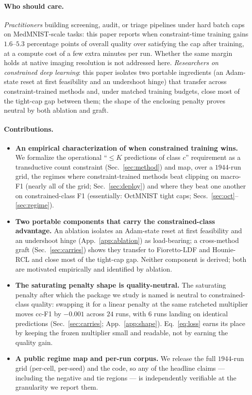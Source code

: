 \documentclass[10pt]{article}
\begin{document}
\paragraph{Who should care.}
\emph{Practitioners} building screening, audit, or triage pipelines under
hard batch caps on MedMNIST-scale tasks: this paper reports when
constraint-time training gains $1.6$--$5.3$ percentage points of overall
quality over satisfying the cap after training, at a compute cost of a few
extra minutes per run. Whether the same margin holds at native imaging
resolution is not addressed here.
\emph{Researchers on constrained deep learning}: this paper isolates two
portable ingredients (an Adam-state reset at first feasibility and an
undershoot hinge) that transfer across constraint-trained methods and,
under matched training budgets, close most of the tight-cap gap between
them; the shape of the enclosing penalty proves neutral by both ablation
and graft.

\paragraph{Contributions.}
\begin{itemize}\itemsep2pt
  \item \textbf{An empirical characterization of when constrained training
  wins.} We formalize the operational ``$\le K$ predictions of class $c$''
  requirement as a transductive count constraint (Sec.~\ref{sec:method}) and
  map, over a $1944$-run grid, the regimes where constraint-trained methods
  beat clipping on macro-F1 (nearly all of the grid;
  Sec.~\ref{sec:deploy}) and where they beat one another on
  constrained-class F1 (essentially: OctMNIST tight caps;
  Secs.~\ref{sec:oct}--\ref{sec:regime}).
  \item \textbf{Two portable components that carry the constrained-class advantage.}
  An ablation isolates an Adam-state reset at first feasibility and an
  undershoot hinge (App.~\ref{app:ablation}) as load-bearing;
  a cross-method graft (Sec.~\ref{sec:carries}) shows they transfer to
  Fioretto-LDF \citep{fioretto2020lagrangian} and Hounie-RCL
  \citep{hounie2023resilient} and close most of the tight-cap gap. Neither
  component is derived; both are motivated empirically and identified by
  ablation.
  \item \textbf{The saturating penalty shape is quality-neutral.} The
  saturating penalty after which the package we study is named is neutral
  to constrained-class quality: swapping it for a linear penalty at the
  same ratcheted multiplier moves cc-F1 by $-0.001$ across $24$ runs,
  with $6$ runs landing on identical predictions
  (Sec.~\ref{sec:carries}; App.~\ref{app:shape}). Eq.~\eqref{eq:loss}
  earns its place by keeping the frozen multiplier small and readable,
  not by earning the quality gain.
  \item \textbf{A public regime map and per-run corpus.} We release the
  full $1944$-run grid (per-cell, per-seed) and the code, so any of the
  headline claims --- including the negative and tie regions --- is
  independently verifiable at the granularity we report them.
\end{itemize}
\end{document}
